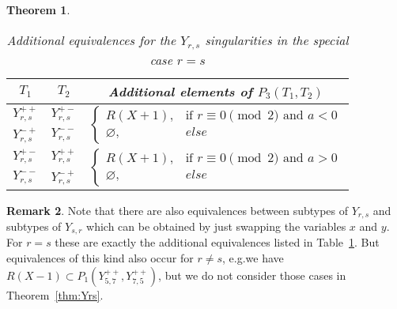 \documentclass{amsproc}
\newtheorem{theorem}{Theorem}
\theoremstyle{definition}
\newtheorem{remark}[theorem]{Remark}
\begin{document}
\begin{theorem}
\begin{table}[!htbp]
\centering
\caption{Additional equivalences for the $Y_{r,s}$ singularities in the
special case $r = s$}
\label{tab:Yrr_equivalences}
\begin{tabular}{|c|c||c|}
\hline

$T_1$ & $T_2$ & Additional elements of $P_3(T_1, T_2)$ \\
\hline\hline

$Y_{r,s}^{++}$ & $Y_{r,s}^{+-}$ &
\multirow{2}{*}{$\begin{cases}
  R(X+1),      &\!\text{if } r \equiv 0 \pmod{2} \text{ and } a < 0 \\
  \varnothing, &else
\end{cases}$}
\\ \cline{1-2}

$Y_{r,s}^{-+}$ & $Y_{r,s}^{--}$ &
\\ \hline

$Y_{r,s}^{+-}$ & $Y_{r,s}^{++}$ &
\multirow{2}{*}{$\begin{cases}
  R(X+1),      &\!\text{if } r \equiv 0 \pmod{2} \text{ and } a > 0 \\
  \varnothing, &else
\end{cases}$}
\\ \cline{1-2}

$Y_{r,s}^{--}$ & $Y_{r,s}^{-+}$ &
\\ \hline

\end{tabular}
\end{table}

\end{theorem}

\begin{remark}
Note that there are also equivalences between subtypes of $Y_{r,s}$ and
subtypes of $Y_{s,r}$ which can be obtained by just swapping the variables $x$
and $y$. For $r = s$ these are exactly the additional equivalences listed in
Table~\ref{tab:Yrr_equivalences}. But equivalences of this kind also occur for
$r \neq s$, e.g.\@ we have $R(X-1) \subset P_1(Y_{5,7}^{++}, Y_{7,5}^{++})$,
but we do not consider those cases in Theorem~\ref{thm:Yrs}.
\end{remark}
\end{document}
